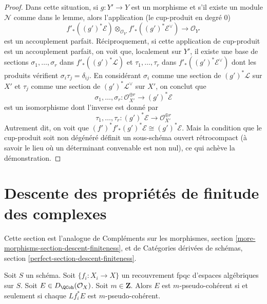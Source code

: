 \begin{proof}
\medskip\noindent
Dans cette situation, si $g : Y' \to Y$ est un morphisme et s'il existe un
module $\mathcal{N}$ comme dans le lemme, alors l'application (le cup-produit en degré $0$)
$$
f'_*((g')^*\mathcal{E})
\otimes_{\mathcal{O}_{Y'}}
f'_*((g')^*\mathcal{E}^\vee)
\longrightarrow \mathcal{O}_{Y'}
$$
est un accouplement parfait. Réciproquement, si cette application de cup-produit est un
accouplement parfait, on voit que, localement sur $Y'$, il existe
une base de sections
$\sigma_1, \ldots, \sigma_r$ dans $f'_*((g')^*\mathcal{L})$ et
$\tau_1, \ldots, \tau_r$ dans
$f'_*((g')^*\mathcal{E}^\vee)$ dont les produits vérifient
$\sigma_i \tau_j = \delta_{ij}$. En considérant $\sigma_i$
comme une section de $(g')^*\mathcal{L}$ sur $X'$
et $\tau_j$ comme une section de $(g')^*\mathcal{L}^\vee$ sur $X'$,
on conclut que
$$
\sigma_1, \ldots, \sigma_r :
\mathcal{O}_{X'}^{\oplus r}
\longrightarrow
(g')^*\mathcal{E}
$$
est un isomorphisme dont l'inverse est donné par
$$
\tau_1, \ldots, \tau_r :
(g')^*\mathcal{E}
\longrightarrow
\mathcal{O}_{X'}^{\oplus r}
$$
Autrement dit, on voit que
$(f')^*f'_*(g')^*\mathcal{E} \cong (g')^*\mathcal{E}$.
Mais la condition que le cup-produit soit non dégénéré
définit un sous-schéma ouvert rétrocompact (à savoir le lieu où un déterminant
convenable est non nul), ce qui achève la démonstration.
\end{proof}









\section{Descente des propriétés de finitude des complexes}
\label{section-descent-finiteness}

\noindent
Cette section est l'analogue de Compléments sur les morphismes,
section \ref{more-morphisms-section-descent-finiteness},
et de
Catégories dérivées de schémas, section
\ref{perfect-section-descent-finiteness}.

\begin{lemma}
\label{lemma-pseudo-coherent-descends-fpqc}
Soit $S$ un schéma. Soit $\{f_i : X_i \to X\}$ un recouvrement fpqc
d'espaces algébriques sur $S$. Soit $E \in D_\QCoh(\mathcal{O}_X)$.
Soit $m \in \mathbf{Z}$. Alors $E$ est $m$-pseudo-cohérent si et seulement si chaque
$Lf_i^*E$ est $m$-pseudo-cohérent.
\end{lemma}

